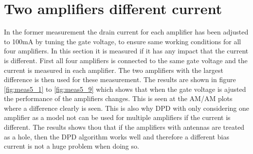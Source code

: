 

\section{Two amplifiers different current}
In the former measurement the drain current for each amplifier has been adjusted to 100mA by tuning the gate voltage, to ensure same working conditions for all four amplifiers. In this section it is measured if it has any impact that the current is different. First all four amplifiers is connected to the same gate voltage and the current is measured in each amplifier. The two amplifiers with the largest difference is then used for these measurement. The results are shown in figure \ref{fig:meas5_1} to \ref{fig:meas5_9} which shows that when the gate voltage is ajusted the performance of the amplifiers changes. This is seen at the AM/AM plots where a difference clearly is seen. This is also why DPD with only considering one amplifier as a model not can be used for multiple amplifiers if the current is different. The results shows thou that if the amplifiers with antennas are treated as a hole, then the DPD algorithm works well and therefore a different bias current is not a huge problem when doing so.


